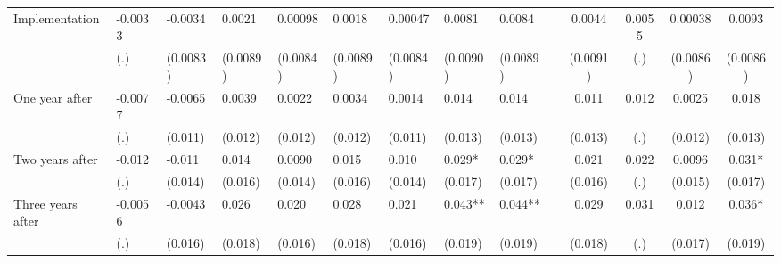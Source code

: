 \begin{tabular}{lccccrrrrrcccc}
Implementation & \multicolumn{1}{l}{-0.0033} & \multicolumn{1}{l}{-0.0034} & \multicolumn{1}{l}{0.0021} & \multicolumn{1}{l}{0.00098} & \multicolumn{1}{l}{0.0018} & \multicolumn{1}{l}{0.00047} & \multicolumn{1}{l}{0.0081} & \multicolumn{1}{l}{0.0084} &       & 0.0044 & 0.0055 & 0.00038 & 0.0093 \\
      & \multicolumn{1}{l}{(.)} & \multicolumn{1}{l}{(0.0083)} & \multicolumn{1}{l}{(0.0089)} & \multicolumn{1}{l}{(0.0084)} & \multicolumn{1}{l}{(0.0089)} & \multicolumn{1}{l}{(0.0084)} & \multicolumn{1}{l}{(0.0090)} & \multicolumn{1}{l}{(0.0089)} &       & (0.0091) & (.)   & (0.0086) & (0.0086) \\
One year after & \multicolumn{1}{l}{-0.0077} & \multicolumn{1}{l}{-0.0065} & \multicolumn{1}{l}{0.0039} & \multicolumn{1}{l}{0.0022} & \multicolumn{1}{l}{0.0034} & \multicolumn{1}{l}{0.0014} & \multicolumn{1}{l}{0.014} & \multicolumn{1}{l}{0.014} &       & 0.011 & 0.012 & 0.0025 & 0.018 \\
      & \multicolumn{1}{l}{(.)} & \multicolumn{1}{l}{(0.011)} & \multicolumn{1}{l}{(0.012)} & \multicolumn{1}{l}{(0.012)} & \multicolumn{1}{l}{(0.012)} & \multicolumn{1}{l}{(0.011)} & \multicolumn{1}{l}{(0.013)} & \multicolumn{1}{l}{(0.013)} &       & (0.013) & (.)   & (0.012) & (0.013) \\
Two years after & \multicolumn{1}{l}{-0.012} & \multicolumn{1}{l}{-0.011} & \multicolumn{1}{l}{0.014} & \multicolumn{1}{l}{0.0090} & \multicolumn{1}{l}{0.015} & \multicolumn{1}{l}{0.010} & \multicolumn{1}{l}{0.029*} & \multicolumn{1}{l}{0.029*} &       & 0.021 & 0.022 & 0.0096 & 0.031* \\
      & \multicolumn{1}{l}{(.)} & \multicolumn{1}{l}{(0.014)} & \multicolumn{1}{l}{(0.016)} & \multicolumn{1}{l}{(0.014)} & \multicolumn{1}{l}{(0.016)} & \multicolumn{1}{l}{(0.014)} & \multicolumn{1}{l}{(0.017)} & \multicolumn{1}{l}{(0.017)} &       & (0.016) & (.)   & (0.015) & (0.017) \\
Three years after & \multicolumn{1}{l}{-0.0056} & \multicolumn{1}{l}{-0.0043} & \multicolumn{1}{l}{0.026} & \multicolumn{1}{l}{0.020} & \multicolumn{1}{l}{0.028} & \multicolumn{1}{l}{0.021} & \multicolumn{1}{l}{0.043**} & \multicolumn{1}{l}{0.044**} &       & 0.029 & 0.031 & 0.012 & 0.036* \\
      & \multicolumn{1}{l}{(.)} & \multicolumn{1}{l}{(0.016)} & \multicolumn{1}{l}{(0.018)} & \multicolumn{1}{l}{(0.016)} & \multicolumn{1}{l}{(0.018)} & \multicolumn{1}{l}{(0.016)} & \multicolumn{1}{l}{(0.019)} & \multicolumn{1}{l}{(0.019)} &       & (0.018) & (.)   & (0.017) & (0.019) \\

\end{tabular}
